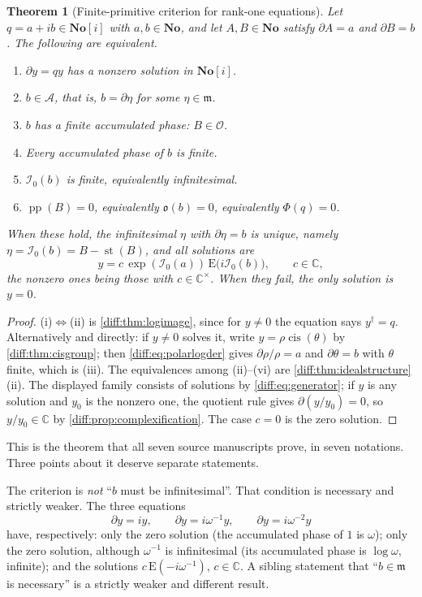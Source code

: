 \documentclass[11pt,letterpaper]{article}
\numberwithin{equation}{section}
\newtheorem{theorem}{Theorem}[section]
\theoremstyle{definition}
\theoremstyle{remark}
\newcommand{\No}{\mathbf{No}}
\newcommand{\SC}{\mathbf{No}[i]}
\newcommand{\C}{\mathbb C}
\newcommand{\der}{\partial}
\newcommand{\Ofin}{\mathcal O}
\newcommand{\mm}{\mathfrak m}
\newcommand{\Acl}{\mathcal A}
\newcommand{\Izero}{\mathcal I_{0}}
\newcommand{\Obs}{\mathfrak o}
\newcommand{\pp}{\operatorname{pp}}
\newcommand{\st}{\operatorname{st}}
\newcommand{\cis}{\operatorname{cis}}
\newcommand{\Emm}{\mathrm{E}}
\begin{document}
\begin{theorem}[Finite-primitive criterion for rank-one equations]
\label{diff:thm:phasecriterion}
Let $q=a+ib\in\SC$ with $a,b\in\No$, and let $A,B\in\No$ satisfy $\der A=a$
and $\der B=b$. The following are equivalent.
\begin{enumerate}[label=\textup{(\roman*)},leftmargin=2.4em]
\item $\der y=qy$ has a nonzero solution in $\SC$.
\item $b\in\Acl$, that is, $b=\der\eta$ for some $\eta\in\mm$.
\item $b$ has a finite accumulated phase: $B\in\Ofin$.
\item Every accumulated phase of $b$ is finite.
\item $\Izero(b)$ is finite, equivalently infinitesimal.
\item $\pp(B)=0$, equivalently $\Obs(b)=0$, equivalently $\Phi(q)=0$.
\end{enumerate}
When these hold, the infinitesimal $\eta$ with $\der\eta=b$ is unique, namely
$\eta=\Izero(b)=B-\st(B)$, and \emph{all} solutions are
\begin{equation}\label{diff:eq:allsolutions}
 y=c\,\exp(\Izero(a))\,\Emm\bigl(i\Izero(b)\bigr),\qquad c\in\C,
\end{equation}
the nonzero ones being those with $c\in\C^{\times}$. When they fail, the only
solution is $y=0$.
\end{theorem}
\begin{proof}
(i)$\Leftrightarrow$(ii) is \cref{diff:thm:logimage}, since for $y\neq0$ the
equation says $y^{\dagger}=q$. Alternatively and directly: if $y\neq0$ solves
it, write $y=\rho\cis(\theta)$ by \cref{diff:thm:cisgroup}; then
\cref{diff:eq:polarlogder} gives $\der\rho/\rho=a$ and $\der\theta=b$ with
$\theta$ finite, which is (iii). The equivalences among
(ii)--(vi) are \cref{diff:thm:idealstructure}(ii). The displayed family
consists of solutions by \cref{diff:eq:generator}; if $y$ is any solution and
$y_{0}$ is the nonzero one, the quotient rule gives $\der(y/y_{0})=0$, so
$y/y_{0}\in\C$ by \cref{diff:prop:complexification}. The case $c=0$ is the
zero solution.
\end{proof}

This is the theorem that all seven source manuscripts prove, in seven
notations. Three points about it deserve separate statements.

\begin{warning}
\label{diff:warn:integrated}
The criterion is \emph{not} ``$b$ must be infinitesimal''. That condition is
necessary and strictly weaker. The three equations
\[
 \der y=iy,\qquad \der y=i\omega^{-1}y,\qquad \der y=i\omega^{-2}y
\]
have, respectively: only the zero solution (the accumulated phase of $1$ is
$\omega$); only the zero solution, although $\omega^{-1}$ is infinitesimal
(its accumulated phase is $\log\omega$, infinite); and the solutions
$c\,\Emm(-i\omega^{-1})$, $c\in\C$. A sibling statement that ``$b\in\mm$ is
necessary'' is a strictly weaker and different result.
\end{warning}
\end{document}
